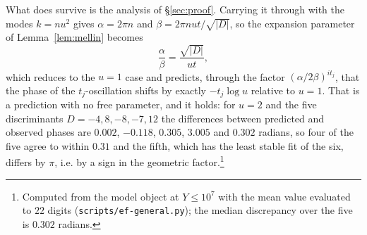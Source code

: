 \documentclass[11pt,a4paper]{article}
\theoremstyle{remark}\newtheorem{remark}[theorem]{Remark}
\begin{document}
What does survive is the analysis of \S\ref{sec:proof}. Carrying it through with the modes $k=nu^2$ gives
$\alpha=2\pi n$ and $\beta=2\pi nut/\sqrt{|D|}$, so the expansion parameter of Lemma~\ref{lem:mellin} becomes
\begin{equation}\label{eq:ugeneral}
\frac\alpha\beta=\frac{\sqrt{|D|}}{ut},
\end{equation}
which reduces to the $u=1$ case and predicts, through the factor $(\alpha/2\beta)^{it_j}$, that the phase of the
$t_j$-oscillation shifts by exactly $-t_j\log u$ relative to $u=1$. That is a prediction with no free parameter, and
it holds: for $u=2$ and the five discriminants $D=-4,8,-8,-7,12$ the differences between predicted and observed
phases are $0.002$, $-0.118$, $0.305$, $3.005$ and $0.302$ radians, so four of the five agree to within $0.31$ and
the fifth, which has the least stable fit of the six, differs by $\pi$, i.e. by a sign in the geometric factor.\footnote{%
Computed from the model object at $Y\le10^7$ with the mean value evaluated to $22$ digits
(\texttt{scripts/ef-general.py}); the median discrepancy over the five is $0.302$ radians.}
\end{document}
